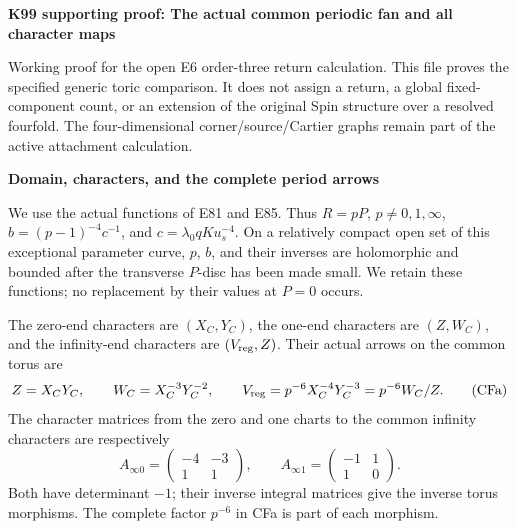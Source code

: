 \par\bigskip\noindent\textbf{K99 supporting proof: The actual common periodic fan and all character maps}\par\nobreak
Working proof for the open E6 order-three return calculation. This file proves the specified generic toric comparison. It does not assign a return, a global fixed-component count, or an extension of the original Spin structure over a resolved fourfold. The four-dimensional corner/source/Cartier graphs remain part of the active attachment calculation.

\par

\medskip\noindent\textbf{Domain, characters, and the complete period arrows}

\par\nobreak

We use the actual functions of E81 and E85. Thus \(R=pP\), \(p\ne0,1,\infty\), \(b=(p-1)^{-4}c^{-1}\), and \(c=\lambda _0qK u_s^{-4}\). On a relatively compact open set of this exceptional parameter curve, \(p\), \(b\), and their inverses are holomorphic and bounded after the transverse \(P\)-disc has been made small. We retain these functions; no replacement by their values at \(P=0\) occurs.

The zero-end characters are \((X_C,Y_C)\), the one-end characters are \((Z,W_C)\), and the infinity-end characters are \((V_{\rm reg},Z)\). Their actual arrows on the common torus are
\[
 Z=X_CY_C,\qquad W_C=X_C^{-3}Y_C^{-2},\qquad
 V_{\rm reg}=p^{-6}X_C^{-4}Y_C^{-3}
             =p^{-6}W_C/Z.                                      \tag{CFa}
\]
The character matrices from the zero and one charts to the common infinity characters are respectively
\[
 A_{\infty0}=\begin{pmatrix}-4&-3\\1&1\end{pmatrix},\qquad
 A_{\infty1}=\begin{pmatrix}-1&1\\1&0\end{pmatrix}.
\]
Both have determinant \(-1\); their inverse integral matrices give the inverse torus morphisms. The complete factor \(p^{-6}\) in CFa is part of each morphism.

